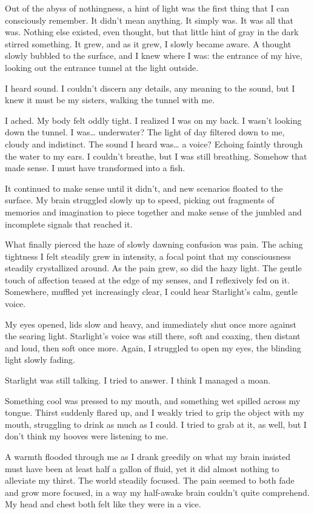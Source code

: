 Out of the abyss of nothingness, a hint of light was the first thing that I can consciously remember. It didn’t mean anything. It simply was. It was all that was. Nothing else existed, even thought, but that little hint of gray in the dark stirred something. It grew, and as it grew, I slowly became aware. A thought slowly bubbled to the surface, and I knew where I was: the entrance of my hive, looking out the entrance tunnel at the light outside.

I heard sound. I couldn’t discern any details, any meaning to the sound, but I knew it must be my sisters, walking the tunnel with me.

I ached. My body felt oddly tight. I realized I was on my back. I wasn’t looking down the tunnel. I was… underwater? The light of day filtered down to me, cloudy and indistinct. The sound I heard was… a voice? Echoing faintly through the water to my ears. I couldn’t breathe, but I was still breathing. Somehow that made sense. I must have transformed into a fish.

It continued to make sense until it didn’t, and new scenarios floated to the surface. My brain struggled slowly up to speed, picking out fragments of memories and imagination to piece together and make sense of the jumbled and incomplete signals that reached it.

What finally pierced the haze of slowly dawning confusion was pain. The aching tightness I felt steadily grew in intensity, a focal point that my consciousness steadily crystallized around. As the pain grew, so did the hazy light. The gentle touch of affection teased at the edge of my senses, and I reflexively fed on it. Somewhere, muffled yet increasingly clear, I could hear Starlight’s calm, gentle voice.

My eyes opened, lids slow and heavy, and immediately shut once more against the searing light. Starlight’s voice was still there, soft and coaxing, then distant and loud, then soft once more. Again, I struggled to open my eyes, the blinding light slowly fading.

Starlight was still talking. I tried to answer. I think I managed a moan.

Something cool was pressed to my mouth, and something wet spilled across my tongue. Thirst suddenly flared up, and I weakly tried to grip the object with my mouth, struggling to drink as much as I could. I tried to grab at it, as well, but I don’t think my hooves were listening to me.

A warmth flooded through me as I drank greedily on what my brain insisted must have been at least half a gallon of fluid, yet it did almost nothing to alleviate my thirst. The world steadily focused. The pain seemed to both fade and grow more focused, in a way my half-awake brain couldn’t quite comprehend. My head and chest both felt like they were in a vice.

